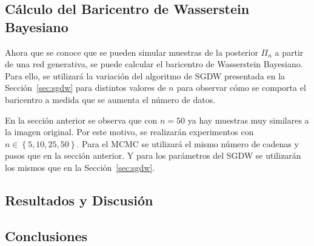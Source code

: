 \subsection{Cálculo del Baricentro de Wasserstein Bayesiano}\label{ssec:calc-bwb}  %

Ahora que se conoce que se pueden simular muestras de la posterior $\Pi_n$ a partir de una red generativa, se puede calcular el baricentro de Wasserstein Bayesiano. Para ello, se utilizará la variación del algoritmo de SGDW presentada en la Sección~\ref{sec:sgdw} para distintos valores de $n$ para observar cómo se comporta el baricentro a medida que se aumenta el número de datos.

En la sección anterior se observa que con $n = 50$ ya hay muestras muy similares a la imagen original. Por este motivo, se realizarán experimentos con $n \in \left\{ 5, 10, 25, 50 \right\}$. Para el MCMC se utilizará el mismo número de cadenas y pasos que en la sección anterior.
Y para los parámetros del SGDW se utilizarán los mismos que en la Sección~\ref{sec:sgdw}.


\subsection{Resultados y Discusión}\label{ssec:bwb-resultados-discusion}  %


\subsection{Conclusiones}\label{ssec:bwb-conclusiones}  %

